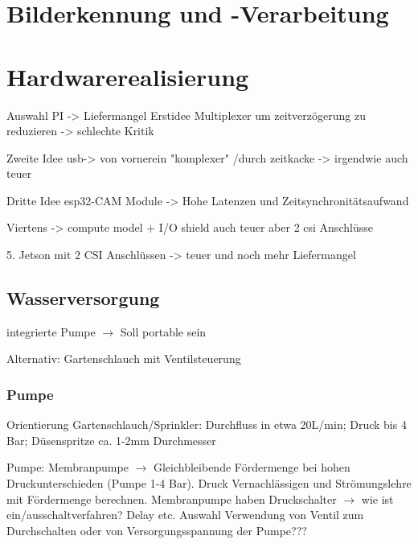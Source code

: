 

\section{Bilderkennung und -Verarbeitung}


\section{Hardwarerealisierung}

Auswahl PI -> Liefermangel
Erstidee Multiplexer um zeitverzögerung zu reduzieren -> schlechte Kritik

Zweite Idee usb-> von vornerein "komplexer" /durch zeitkacke -> irgendwie auch teuer

Dritte Idee esp32-CAM Module -> Hohe Latenzen und Zeitsynchronitätsaufwand

Viertens -> compute model + I/O shield auch teuer aber 2 csi Anschlüsse

5. Jetson mit 2 CSI Anschlüssen -> teuer und noch mehr Liefermangel

\subsection{Wasserversorgung}

integrierte Pumpe $\rightarrow$ Soll portable sein

Alternativ: Gartenschlauch mit Ventilsteuerung

\subsubsection{Pumpe}

Orientierung Gartenschlauch/Sprinkler:
Durchfluss in etwa 20L/min; Druck bis 4 Bar; Düsenspritze ca. 1-2mm Durchmesser

Pumpe: Membranpumpe $\rightarrow$ Gleichbleibende Fördermenge
bei hohen Druckunterschieden (Pumpe 1-4 Bar).
Druck Vernachlässigen und Strömungslehre mit Fördermenge
berechnen. Membranpumpe haben Druckschalter $\rightarrow$
wie ist ein/ausschaltverfahren? Delay etc. Auswahl Verwendung
von Ventil zum Durchschalten oder von Versorgungsspannung der Pumpe???

